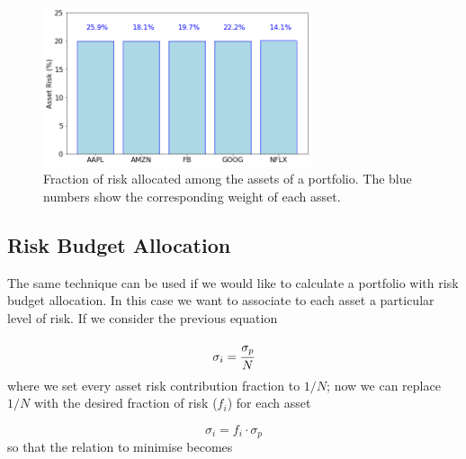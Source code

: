 \begin{figure}[htb]
	\centering
	\includegraphics[width=0.7\textwidth]{figures/risk_parity}
	\caption{Fraction of risk allocated among the assets of a portfolio. The blue numbers show the corresponding weight of each asset.}
	\label{fig:risk_parity}
\end{figure}

\subsection{Risk Budget Allocation}
\label{risk-budget-allocation}

The same technique can be used if we would like to calculate a portfolio with risk budget allocation. In this case we want to associate to each asset a particular level of risk. If we consider the previous equation

\begin{equation} 
\sigma _{i}=\cfrac{\sigma_p}{N} 
\end{equation}
where we set every asset risk contribution fraction to \(1/N\); now we can replace \(1/N\) with the desired fraction of risk (\(f_i\)) for each asset

\begin{equation} 
\sigma _{i}=f_i \cdot \sigma_p 
\end{equation}
so that the relation to minimise becomes

